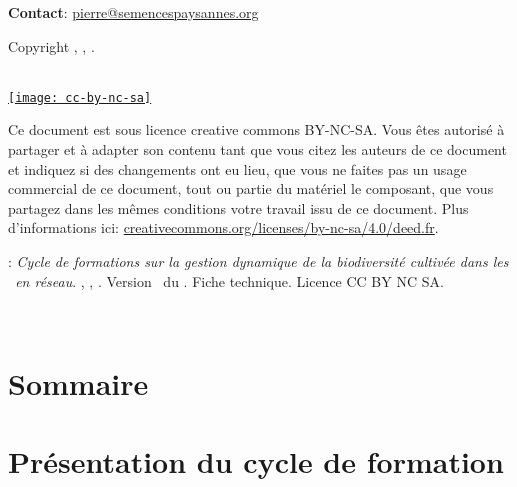 \noindent\up{*} \textbf{Contact}: \href{mailto:pierre@semencespaysannes.org}{\textcolor{mln-green} {pierre@semencespaysannes.org}}

\normalsize

\vfill

\begin{center}
Copyright \RSP, \INRA, \ITAB.

~\\

\href{http://creativecommons.org/licenses/by-nc-sa/4.0/deed.fr}{\texttt{[image: cc-by-nc-sa]}}
\end{center}

\small
Ce document est sous licence creative commons BY-NC-SA.
Vous êtes autorisé à partager et à adapter son contenu tant 
que vous citez les auteurs de ce document et indiquez si des changements ont eu lieu, 
que vous ne faites pas un usage commercial de ce document, tout ou partie du matériel le composant,
que vous partagez dans les mêmes conditions votre travail issu de ce document. 
Plus d'informations ici: \url{creativecommons.org/licenses/by-nc-sa/4.0/deed.fr}.

\vfill

:
\textit{
Cycle de formations sur la gestion dynamique de la biodiversité cultivée dans les
\MSPs~en réseau}.
\RSP, \INRA, \ITAB.
Version \versionCF~du \dateversionCF.
Fiche technique.
Licence CC BY NC SA.


\newpage ~\\ \newpage 

\pagestyle{empty} %
\chapter*{Sommaire}
\cleardoublepage %
\pagestyle{fancy} %

\hypersetup{colorlinks=true}

\newpage \pagestyle{plain}


\chapter{Présentation du cycle de formation}










